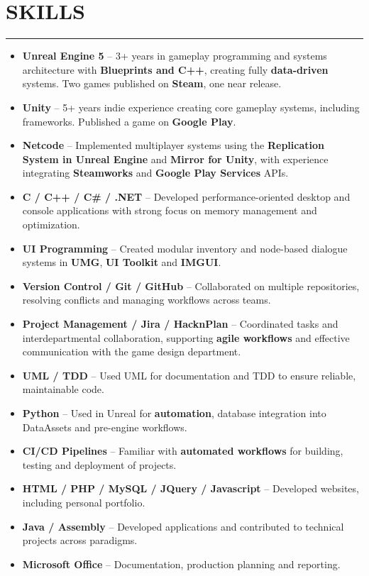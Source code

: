 \documentclass[7pt]{article}
\newcommand{\sectionline}{\vspace{-0.3em}\noindent\rule{\linewidth}{0.15pt}\vspace{0.08em}}
\newcommand{\cvsection}[2]{%
    \vspace{-.6em}
    \section*{{\large\textbf{\MakeUppercase{#1}}}}
    \vspace{-0.5em}
    \sectionline
    \vspace{-0.15em}
    #2
}
\begin{document}
    \cvsection{SKILLS}{
        \begin{itemize}[noitemsep, topsep=0pt, parsep=0pt, partopsep=0pt, itemsep=0pt, leftmargin=*]
            \item \textbf{Unreal Engine 5} – 3+ years in gameplay programming and systems architecture with \textbf{Blueprints and C++}, creating fully \textbf{data-driven} systems. Two games published on \textbf{Steam}, one near release.
            \item \textbf{Unity} – 5+ years indie experience creating core gameplay systems, including frameworks. Published a game on \textbf{Google Play}.
            \item \textbf{Netcode} – Implemented multiplayer systems using the \textbf{Replication System in Unreal Engine} and \textbf{Mirror for Unity}, with experience integrating \textbf{Steamworks} and \textbf{Google Play Services} APIs.
            \item \textbf{C / C++ / C\# / .NET} – Developed performance-oriented desktop and console applications with strong focus on memory management and optimization.
            \item \textbf{UI Programming} – Created modular inventory and node-based dialogue systems in \textbf{UMG}, \textbf{UI Toolkit} and \textbf{IMGUI}.
            \item \textbf{Version Control / Git / GitHub} – Collaborated on multiple repositories, resolving conflicts and managing workflows across teams.
            \item \textbf{Project Management / Jira / HacknPlan} – Coordinated tasks and interdepartmental collaboration, supporting \textbf{agile workflows} and effective communication with the game design department.
            \item \textbf{UML / TDD} – Used UML for documentation and TDD to ensure reliable, maintainable code.
            \item \textbf{Python} – Used in Unreal for \textbf{automation}, database integration into DataAssets and pre-engine workflows.
            \item \textbf{CI/CD Pipelines} – Familiar with \textbf{automated workflows} for building, testing and deployment of projects.
            \item \textbf{HTML / PHP / MySQL / JQuery / Javascript} – Developed websites, including personal portfolio.
            \item \textbf{Java / Assembly} – Developed applications and contributed to technical projects across paradigms.
            \item \textbf{Microsoft Office} – Documentation, production planning and reporting.
        \end{itemize}
    }
\end{document}
